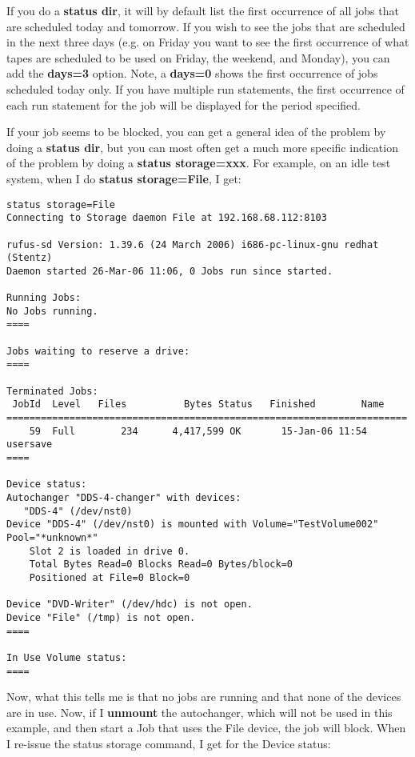 \begin{description}
   If you do a {\bf status dir}, it will by default list the first
   occurrence of all jobs that are scheduled today and tomorrow.  If you
   wish to see the jobs that are scheduled in the next three days (e.g.  on
   Friday you want to see the first occurrence of what tapes are scheduled
   to be used on Friday, the weekend, and Monday), you can add the {\bf
   days=3} option.  Note, a {\bf days=0} shows the first occurrence of jobs
   scheduled today only.  If you have multiple run statements, the first
   occurrence of each run statement for the job will be displayed for the
   period specified.

   If your job seems to be blocked, you can get a general idea of the
   problem by doing a {\bf status dir}, but you can most often get a
   much more specific indication of the problem by doing a
   {\bf status storage=xxx}.  For example, on an idle test system, when
   I do {\bf status storage=File}, I get:
\footnotesize
\begin{verbatim}
status storage=File
Connecting to Storage daemon File at 192.168.68.112:8103

rufus-sd Version: 1.39.6 (24 March 2006) i686-pc-linux-gnu redhat (Stentz)
Daemon started 26-Mar-06 11:06, 0 Jobs run since started.

Running Jobs:
No Jobs running.
====

Jobs waiting to reserve a drive:
====

Terminated Jobs:
 JobId  Level   Files          Bytes Status   Finished        Name
======================================================================
    59  Full        234      4,417,599 OK       15-Jan-06 11:54 usersave
====

Device status:
Autochanger "DDS-4-changer" with devices:
   "DDS-4" (/dev/nst0)
Device "DDS-4" (/dev/nst0) is mounted with Volume="TestVolume002"
Pool="*unknown*"
    Slot 2 is loaded in drive 0.
    Total Bytes Read=0 Blocks Read=0 Bytes/block=0
    Positioned at File=0 Block=0

Device "DVD-Writer" (/dev/hdc) is not open.
Device "File" (/tmp) is not open.
====

In Use Volume status:
====
\end{verbatim}
\normalsize

Now, what this tells me is that no jobs are running and that none of
the devices are in use.  Now, if I {\bf unmount} the autochanger, which
will not be used in this example, and then start a Job that uses the
File device, the job will block.  When I re-issue the status storage
command, I get for the Device status:


\end{description}
